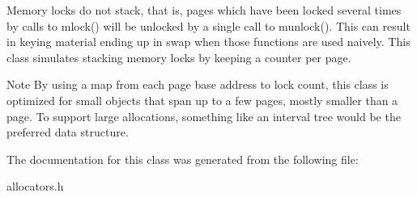 Memory locks do not stack, that is, pages which have been locked several times by calls to mlock() will be unlocked by a single call to munlock(). This can result in keying material ending up in swap when those functions are used naively. This class simulates stacking memory locks by keeping a counter per page.

\begin{DoxyNote}{Note}
By using a map from each page base address to lock count, this class is optimized for small objects that span up to a few pages, mostly smaller than a page. To support large allocations, something like an interval tree would be the preferred data structure. 
\end{DoxyNote}


The documentation for this class was generated from the following file\+:\begin{DoxyCompactItemize}
\item 
allocators.\+h\end{DoxyCompactItemize}
